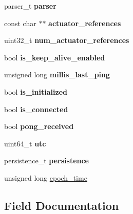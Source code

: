 \begin{DoxyCompactItemize}
\item 
\mbox{\label{struct__wolk__ctx__t_a75482b6b5f654f444aecd3ce133bcc8a}} 
parser\+\_\+t {\bfseries parser}
\item 
\mbox{\label{struct__wolk__ctx__t_a87d5e3b33fed53ef02c61111860fe929}} 
const char $\ast$$\ast$ {\bfseries actuator\+\_\+references}
\item 
\mbox{\label{struct__wolk__ctx__t_a3a96676f3cede3bd6f6e31d9cee30443}} 
uint32\+\_\+t {\bfseries num\+\_\+actuator\+\_\+references}
\item 
\mbox{\label{struct__wolk__ctx__t_a020de31835a1a0105cf149f2c66c4a1d}} 
bool {\bfseries is\+\_\+keep\+\_\+alive\+\_\+enabled}
\item 
\mbox{\label{struct__wolk__ctx__t_a24b3f143537e83d0bafe01724972e68b}} 
unsigned long {\bfseries millis\+\_\+last\+\_\+ping}
\item 
\mbox{\label{struct__wolk__ctx__t_a65aec58259024398da781689ad05799a}} 
bool {\bfseries is\+\_\+initialized}
\item 
\mbox{\label{struct__wolk__ctx__t_abeedd5d0c334aab47fd6aac270b8d1e0}} 
bool {\bfseries is\+\_\+connected}
\item 
\mbox{\label{struct__wolk__ctx__t_a756475fe4cd97ed31ae3e665692c3f48}} 
bool {\bfseries pong\+\_\+received}
\item 
\mbox{\label{struct__wolk__ctx__t_a3305c6c1222a548f0e62ab496ab99d3c}} 
uint64\+\_\+t {\bfseries utc}
\item 
\mbox{\label{struct__wolk__ctx__t_acedc150706ec304c5045f9c77b065ccd}} 
persistence\+\_\+t {\bfseries persistence}
\item 
unsigned long \hyperlink{struct__wolk__ctx__t_a0c63c52881404b0305e8b4dba0b0b6a6}{epoch\+\_\+time}
\end{DoxyCompactItemize}


\subsection{Field Documentation}
\mbox{\label{struct__wolk__ctx__t_ac55ed80718abb1dca3027edda713ca57}} 
